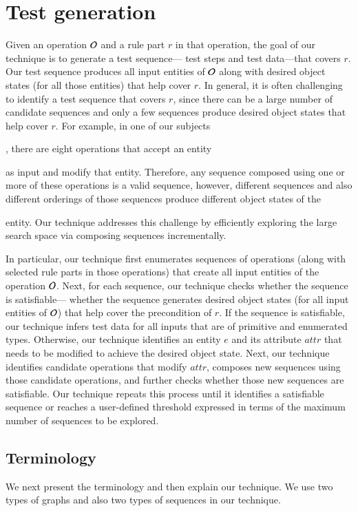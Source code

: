 \section{Test generation}

Given an operation ${\cal O}$ and a rule part $r$ in that operation, the goal 
of our technique is to generate a test sequence---\ie{} test steps and
test data---that covers $r$. Our test sequence produces
all input entities of ${\cal O}$ along with desired object states 
(for all those entities) that help cover $r$. 
In general, it is often challenging to identify a test sequence
that covers $r$, since there can be a large number of candidate sequences
and only a few sequences produce desired object states that help
cover $r$. For example, in one of our subjects \subject{Cebu-pacific},
there are eight operations that accept an entity \subject{Ticket}
as input and modify that entity. Therefore,
any sequence composed using one or more of these operations is a valid sequence, however, different 
sequences and also different orderings of those sequences
produce different object states of the \subject{Ticket} entity. 
Our technique addresses this challenge by efficiently
exploring the large search space via composing sequences incrementally.

In particular, our technique first enumerates
sequences of operations (along with selected rule parts in those operations) 
that create all input entities of the operation ${\cal O}$. 
Next, for each sequence, our technique checks whether
the sequence is satisfiable---\ie{} whether the sequence generates desired
object states (for all input entities of ${\cal O}$) that help cover the
precondition of $r$. If the sequence is satisfiable, our technique
infers test data for all inputs that are of primitive and enumerated types. 
Otherwise, our technique identifies an entity $e$ 
and its attribute $attr$ that needs to be modified
to achieve the desired object state. Next, our technique identifies candidate
operations that modify $attr$, composes
new sequences using those candidate operations, and further checks whether those
new sequences are satisfiable. Our technique repeats this
process until it identifies a satisfiable sequence or reaches a user-defined threshold
expressed in terms of the maximum number of sequences to be explored.

\subsection{Terminology}
We next present the terminology and then explain our technique. We use two types of graphs
and also two types of sequences in our technique.

